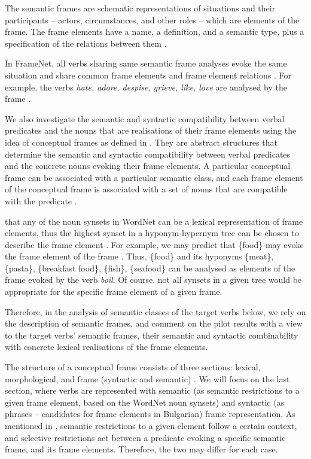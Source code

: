 \documentclass[output=paper,colorlinks,citecolor=brown]{langscibook}
\begin{document}
The semantic frames are schematic representations of situations and their participants -- actors, circumstances, and other roles -- which are elements of the frame. The frame elements have a name, a definition, and a semantic type, plus a specification of the relations between them \citep{Fillmore2000}.

In FrameNet, all verbs sharing same semantic frame analyses evoke the same situation and share common frame elements and frame element relations \citep{Ruppenhoferetal:2016}. For example, the verbs \textit{hate, adore, despise, grieve, like, love} are analysed by the frame  \citep{svetla-2021-towards}. 

We also investigate the semantic and syntactic compatibility between verbal predicates and the nouns that are realisations of their frame elements using the idea of conceptual frames as defined in \citep{Koeva:2021}. They are abstract structures that determine the semantic and syntactic compatibility between verbal predicates and the concrete nouns evoking their frame elements. A particular conceptual frame can be associated with a particular semantic class, and each frame element of the conceptual frame is associated with a set of nouns that are compatible with the predicate \citep{svetla-2021-towards}.

 that any of the noun synsets in WordNet can be a lexical representation of frame elements, thus the highest synset in a hyponym-hypernym tree can be chosen to describe the frame element \citep{KoevaDoychev:2022}. For example, we may predict that \{food\} may evoke the frame element  of the frame . Thus, \{food\} and its hyponyms \{meat\}, \{pasta\}, \{breakfast food\}, \{fish\}, \{seafood\} can be analysed as elements of the frame evoked by the verb \textit{boil}. Of course, not all synsets in a given tree would be appropriate for the specific frame element of a given frame.

Therefore, in the analysis of semantic classes of the target verbs below, we rely on the description of semantic frames, and comment on the pilot results with a view to the target verbs' semantic frames, their semantic and syntactic combinability with concrete lexical realisations of the frame elements.

The structure of a conceptual frame consists of three sections: lexical, morphological, and frame (syntactic and semantic) \citep{KoevaDoychev:2022}. We will focus on the last section, where verbs are represented with semantic (as semantic restrictions to a given frame element, based on the WordNet noun synsets) and syntactic (as phrases -- candidates for frame elements in Bulgarian) frame representation. As mentioned in \citep{KoevaDoychev:2022}, semantic restrictions to a given element follow a certain context, and selective restrictions act between a predicate evoking a specific semantic frame, and its frame elements. Therefore, the two may differ for each case.
\end{document}
